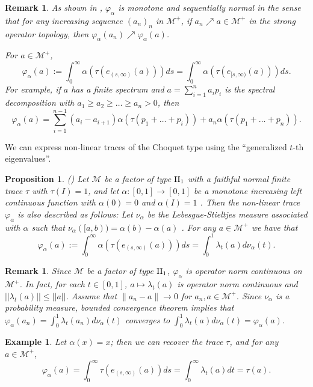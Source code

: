 \documentclass[a4paper,12pt]{amsart}
\newtheorem{remark}[definition]{Remark}
\newtheorem{example}[definition]{Example}
\newtheorem{proposition}[definition]{Proposition}
\newcommand{\M}{\mathcal{M}}
\begin{document}
\begin{remark} \rm
As shown in \cite{nagisawatatani4},  $\varphi_{\alpha}$ is monotone and sequentially normal in the sense that for any increasing  sequence 
$(a_n)_n$ in $\M^+$, if $ a_n \nearrow a \in \M^+$ in the strong operator topology, then $\varphi_{\alpha}(a_n)  \nearrow \varphi_{\alpha}(a) $. 

For  $a \in \M^+$, 
$$
 \varphi_{\alpha}(a) := \int_0^{\infty}  \alpha(\tau(e_{(s,\infty)}(a)))ds  
 =  \int_0^{\infty}  \alpha(\tau(e_{[s,\infty)}(a)))ds .
$$
For example,  if $a$ has a finite spectrum and 
$a = \sum_{i=1}^{n} a_ip_i$ is the spectral decomposition with $a_1 \geq a_2 \geq \dots \geq a_n > 0$, then 
$$
\varphi_{\alpha}(a) =  \sum_{i=1} ^{n-1} (a_i- a_{i+1})\alpha(\tau(p_1 + \dots + p_i)) +
 a_n \alpha(\tau(p_1 + \dots + p_n)). 
$$
\end{remark}
We can express non-linear traces of the Choquet type using the ``generalized $t$-th eigenvalues''. 
\begin{proposition} {\rm (}\cite[Proposition 2.24]{nagisawatatani4}{\rm )}
\label{prop:Stieltjes}
Let $\M$ be a factor of type ${\rm II}_1$ 
with a faithful normal finite trace $\tau$ with $\tau(I) = 1$, and 
let $\alpha: [0,1]  \rightarrow [0, 1]$ be a 
monotone increasing left continuous function with $\alpha(0) = 0$ and $\alpha(I) = 1$ .
Then the non-linear trace $\varphi_{\alpha}$ is also described as follows: Let $\nu_{\alpha}$ be the Lebesgue-Stieltjes measure 
associated with $\alpha$ such that $\nu_{\alpha}([a,b)) = \alpha(b) - \alpha(a)$ .
For any $a \in \M^+$ we have that 
$$
\varphi_{\alpha}(a) 
 := \int_0^{\infty}  \alpha(\tau(e_{(s,\infty)}(a)))ds = \int_0^1 \lambda_t(a) d\nu_{\alpha}(t). 
$$
\end{proposition}
\begin{remark} \rm
Since  $\M$ be a factor of type ${\rm II}_1$,  $\varphi_{\alpha}$ is operator norm continuous on $\M^+$.  In fact, 
for each $t \in [0,1]$, $a \mapsto  \lambda_t(a)$ is operator norm continuous and 
$|| \lambda_t(a) ||  \leq ||a||$. 
Assume that $\|a_n - a\| \rightarrow 0$ 
for $a_n, a \in \M^+$. Since  $\nu_{\alpha}$ is a probability measure, bounded convergence theorem implies 
that $\varphi_{\alpha}(a_n) = 
\int_0^1 \lambda_t(a_n) d\nu_{\alpha}(t)$ converges to 
$\int_0^1 \lambda_t(a) d\nu_{\alpha}(t) = \varphi_{\alpha}(a)$.  
\end{remark}

\begin{example} \rm
Let $\alpha(x) = x$; then we can recover the trace $\tau$,  and for any $a \in \M^+$, 
$$
\varphi_{\alpha}(a) 
 = \int_0^{\infty}  \tau(e_{(s,\infty)}(a))ds = \int_0^{\infty} \lambda_t(a) dt =\tau(a). 
$$
\end{example}
\end{document}
